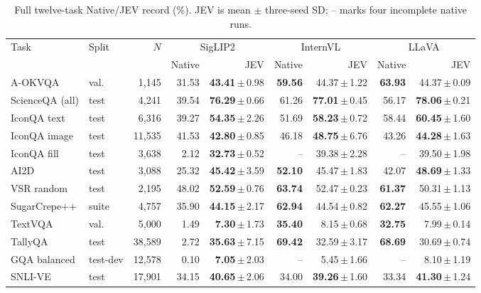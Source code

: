 \begin{table}[t]
\centering\small
\setlength{\tabcolsep}{3pt}\renewcommand{\arraystretch}{1.10}
\caption{Full twelve-task Native/JEV record (\%). JEV is mean $\pm$ three-seed SD; -- marks four incomplete native runs.}
\label{tab:full-results}
\begin{tabular}{@{}llrrr@{\hspace{6pt}}rr@{\hspace{6pt}}rr@{}}
\toprule
Task & Split & $N$ & \multicolumn{2}{c}{SigLIP2} & \multicolumn{2}{c}{InternVL} & \multicolumn{2}{c}{LLaVA} \\
\cmidrule(lr){4-5}\cmidrule(lr){6-7}\cmidrule(l){8-9}
 & & & Native & JEV & Native & JEV & Native & JEV \\
\midrule
A-OKVQA & val. & 1,145 & 31.53 & \textbf{43.41}\,$\pm$\,0.98 & \textbf{59.56} & 44.37\,$\pm$\,1.22 & \textbf{63.93} & 44.37\,$\pm$\,0.09 \\
ScienceQA (all) & test & 4,241 & 39.54 & \textbf{76.29}\,$\pm$\,0.66 & 61.26 & \textbf{77.01}\,$\pm$\,0.45 & 56.17 & \textbf{78.06}\,$\pm$\,0.21 \\
IconQA text & test & 6,316 & 39.27 & \textbf{54.35}\,$\pm$\,2.26 & 51.69 & \textbf{58.23}\,$\pm$\,0.72 & 58.44 & \textbf{60.45}\,$\pm$\,1.60 \\
IconQA image & test & 11,535 & 41.53 & \textbf{42.80}\,$\pm$\,0.85 & 46.18 & \textbf{48.75}\,$\pm$\,6.76 & 43.26 & \textbf{44.28}\,$\pm$\,1.63 \\
IconQA fill & test & 3,638 & 2.12 & \textbf{32.73}\,$\pm$\,0.52 & -- & 39.38\,$\pm$\,2.28 & -- & 39.50\,$\pm$\,1.98 \\
AI2D & test & 3,088 & 25.32 & \textbf{45.42}\,$\pm$\,3.59 & \textbf{52.10} & 45.47\,$\pm$\,1.83 & 42.07 & \textbf{48.69}\,$\pm$\,1.33 \\
VSR random & test & 2,195 & 48.02 & \textbf{52.59}\,$\pm$\,0.76 & \textbf{63.74} & 52.47\,$\pm$\,0.23 & \textbf{61.37} & 50.31\,$\pm$\,1.13 \\
SugarCrepe++ & suite & 4,757 & 35.90 & \textbf{44.15}\,$\pm$\,2.17 & \textbf{62.94} & 44.54\,$\pm$\,0.82 & \textbf{62.27} & 45.55\,$\pm$\,1.06 \\
TextVQA & val. & 5,000 & 1.49 & \textbf{7.30}\,$\pm$\,1.73 & \textbf{35.40} & 8.15\,$\pm$\,0.68 & \textbf{32.75} & 7.99\,$\pm$\,0.14 \\
TallyQA & test & 38,589 & 2.72 & \textbf{35.63}\,$\pm$\,7.15 & \textbf{69.42} & 32.59\,$\pm$\,3.17 & \textbf{68.69} & 30.69\,$\pm$\,0.74 \\
GQA balanced & test-dev & 12,578 & 0.10 & \textbf{7.05}\,$\pm$\,2.03 & -- & 5.45\,$\pm$\,1.66 & -- & 8.10\,$\pm$\,1.19 \\
SNLI-VE & test & 17,901 & 34.15 & \textbf{40.65}\,$\pm$\,2.06 & 34.00 & \textbf{39.26}\,$\pm$\,1.60 & 33.34 & \textbf{41.30}\,$\pm$\,1.24 \\
\bottomrule
\end{tabular}
\end{table}
